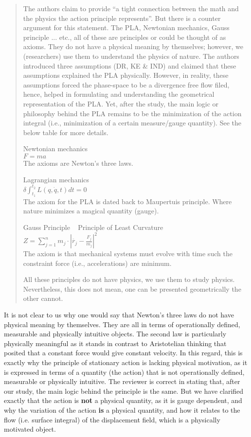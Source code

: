 \documentclass[11pt, executivepaper]{article}
\begin{document}
 
\begin{quote}
 The authors claim to provide “a tight connection between the math and the physics the action principle represents”. But there is a counter argument for this statement. The PLA, Newtonian mechanics, Gauss principle ... etc., all of these are principles or could be thought of as axioms. They do not have a physical meaning by themselves; however, we (researchers) use them to understand the physics of nature. The authors introduced three assumptions (DR, KE \& IND) and claimed that these assumptions explained the PLA physically. However, in reality, these assumptions forced the phase-space to be a divergence free flow filed, hence, helped in formulating and understanding the geometrical representation of the PLA. Yet, after the study, the main logic or philosophy behind the PLA remains to be the minimization of the action integral (i.e., minimization of a certain measure/gauge quantity). See the below table for more details.
 
 Newtonian mechanics \\
 $\mathit{F}=m\mathit{a}$ \\
 The axioms are Newton’s three laws.
 
 Lagrangian mechanics \\
 $\delta\int_{t_1}^{t_2}L\left(q,\dot{q},t\right)dt=0$ \\
 The axiom for the PLA is dated back to Maupertuis principle. Where nature minimizes a magical quantity (gauge).
 
 Gauss Principle ~ Principle of Least Curvature \\ 
 $Z=\sum_{j=1}^{n}m_j\cdot\left|\ddot{r_j}-\frac{F_j}{m_j}\right|^2$ \\
 The axiom is that mechanical systems must evolve with time such the constraint force (i.e., accelerations) are minimum. 
 
 All these principles do not have physics, we use them to study physics. Nevertheless, this does not mean, one can be presented geometrically the other cannot. 
\end{quote}
It is not clear to us why one would say that Newton’s three laws do not have physical meaning by themselves. They are all in terms of operationally defined, measurable and physically intuitive objects. The second law is particularly physically meaningful as it stands in contrast to Aristotelian thinking that posited that a constant force would give constant velocity. In this regard, this is exactly why the principle of stationary action is lacking physical motivation, as it is expressed in terms of a quantity (the action) that is not operationally defined, measurable or physically intuitive. The reviewer is correct in stating that, after our study, the main logic behind the principle is the same. But we have clarified exactly that the action is \textbf{not} a physical quantity, as it is gauge dependent, and why the variation of the action \textbf{is} a physical quantity, and how it relates to the flow (i.e. surface integral) of the displacement field, which is a physically motivated object.
\end{document}
